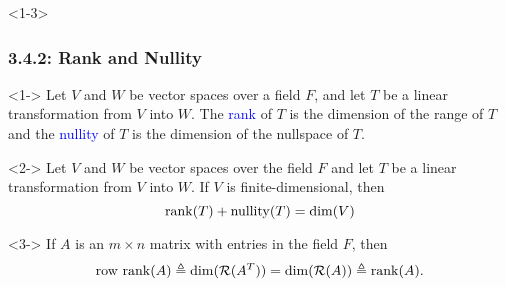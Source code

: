 \documentclass[10pt,english,aspectratio=169]{beamer}
\begin{document}
\begin{frame}<1-3> \frametitle{3.4.2: Rank and Nullity}

\vspace{-1mm}

\begin{definition}<1->
Let $V$ and $W$ be vector spaces over a field $F$, and let $T$ be a linear transformation from $V$ into $W$.
The \textcolor{blue}{rank} of $T$ is the dimension of the range of $T$ and the \textcolor{blue}{nullity} of $T$ is the dimension of the nullspace of $T$.
\end{definition}

\begin{theorem}<2->
Let $V$ and $W$ be vector spaces over the field $F$ and let $T$ be a linear transformation from $V$ into $W$.
If $V$ is finite-dimensional, then \vspace{-2mm}
\begin{equation*}
\mathrm{rank} (T) + \mathrm{nullity} (T) = \dim (V)
\end{equation*}
\end{theorem}

\vspace{-0.5mm}



\begin{theorem}<3->
If $A$ is an $m \times n$ matrix with entries in the field $F$, then \vspace{-2mm}
\begin{equation*} 
\mathrm{row~rank} (A) \triangleq \dim( \mathcal{R}(A^T)) =  \dim( \mathcal{R}(A)) \triangleq \mathrm{rank} (A).
\end{equation*}
\end{theorem}

\vspace{-0.5mm}




\end{frame}
\end{document}
